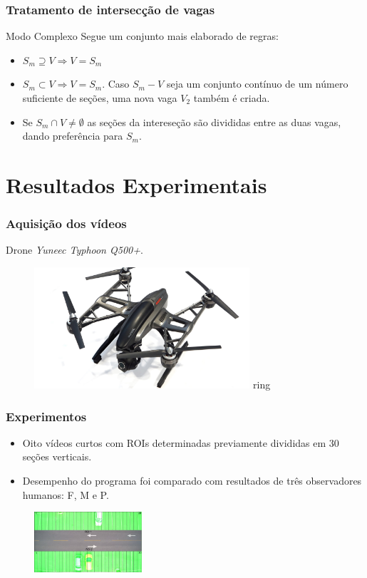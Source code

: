 \documentclass{beamer}
\begin{document}
\begin{frame}
\frametitle{Tratamento de intersecção de vagas}
\begin{block}{Modo Complexo}
Segue um conjunto mais elaborado de regras:
\begin{itemize}
\item $S_m \supseteq V \Rightarrow V = S_m$
\item $S_m \subset V \Rightarrow V = S_m$. Caso $S_m - V$ seja um conjunto contínuo de um número suficiente de seções, uma nova vaga $V_2$ também é criada.
\item Se $S_m \cap V \neq \emptyset$ as seções da intereseção são divididas entre as duas vagas, dando preferência para $S_m$.  
\end{itemize}
\end{block}
\end{frame}

\section{Resultados Experimentais}
\begin{frame}
\frametitle{Aquisição dos vídeos}
Drone \textit{Yuneec Typhoon Q500+}.
\begin{figure}
\centering
\includegraphics[width=8cm]{drone}
\cente
ring
\end{figure}
\end{frame}

\begin{frame}
\frametitle{Experimentos}
\begin{itemize}
\item Oito vídeos curtos com ROIs determinadas previamente divididas em $30$ seções verticais.
\item Desempenho do programa foi comparado com resultados de três observadores humanos: F, M e P.
\end{itemize}

\begin{figure}
\centering
\includegraphics[width=4cm]{instrucoes}
\centering
\end{figure}
\end{frame}
\end{document}
